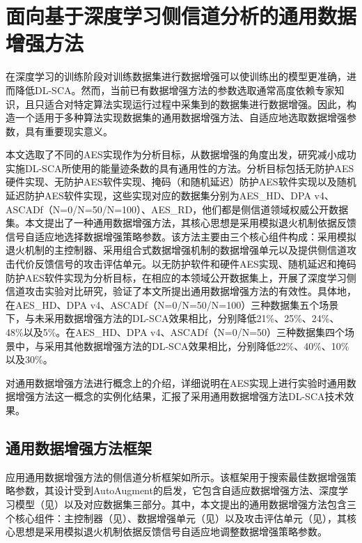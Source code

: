 \chapter{面向基于深度学习侧信道分析的通用数据增强方法}\label{chap:search1}{
	
	在深度学习的训练阶段对训练数据集进行数据增强可以使训练出的模型更准确，进而降低DL-SCA\chenggongtiaoshu 。然而，当前已有数据增强方法的参数选取通常高度依赖专家知识，且只适合对特定算法实现运行过程中采集到的数据集进行数据增强。因此，构造一个适用于多种算法实现数据集的通用数据增强方法、自适应地选取数据增强参数，具有重要现实意义。
	
	本文选取了不同的AES实现作为分析目标，从数据增强的角度出发，研究减小成功实施DL-SCA所使用的能量迹条数的具有通用性的方法。分析目标包括无防护AES硬件实现、无防护AES软件实现、掩码（和随机延迟）防护AES软件实现以及随机延迟防护AES软件实现，这些实现对应的数据集分别为AES\_HD、DPA v4、ASCADf（N=0/N=50/N=100）、AES\_RD，他们都是侧信道领域权威公开数据集。本文提出了一种通用数据增强方法，其核心思想是采用模拟退火机制依据反馈信号自适应地选择数据增强策略参数。该方法主要由三个核心组件构成：采用模拟退火机制的主控制器、采用组合式数据增强机制的数据增强单元以及提供侧信道攻击代价反馈信号的攻击评估单元。以无防护软件和硬件AES实现、随机延迟和掩码防护AES软件实现为分析目标，在相应的本领域公开数据集上，开展了深度学习侧信道攻击实验对比研究，验证了本文所提出通用数据增强方法的有效性。具体地，在AES\_HD、DPA v4、ASCADf（N=0/N=50/N=100）三种数据集五个场景下，与未采用数据增强方法的DL-SCA效果相比，\chenggongtiaoshu 分别降低21\%、25\%、24\%、48\%以及5\%。在AES\_HD、DPA v4、ASCADf（N=0/N=50）三种数据集四个场景中，与采用其他数据增强方法的DL-SCA效果相比，\chenggongtiaoshu 分别降低22\%、40\%、10\%以及30\%。
	
	{\color{\xchange}
	
	对通用数据增强方法进行概念上的介绍，详细说明在AES实现上进行实验时通用数据增强方法这一概念的实例化结果，汇报了采用通用数据增强方法DL-SCA技术效果。
	}
	
	\section{通用数据增强方法框架}\label{sec:framework}
	应用通用数据增强方法的侧信道分析框架如所示。该框架用于搜索最佳数据增强策略参数，其设计受到AutoAugment\citep{Cubuk19}的启发，它包含自适应数据增强方法、深度学习模型（见）以及对应数据集三部分。其中，本文提出的通用数据增强方法包含三个核心组件：主控制器（见）、数据增强单元（见）以及攻击评估单元（见），其核心思想是采用模拟退火机制依据反馈信号自适应地调整数据增强策略参数。
	
}
